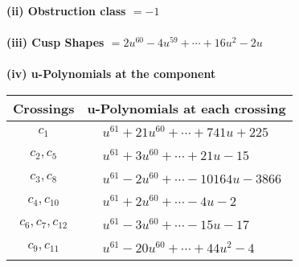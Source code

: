 \documentclass[1p]{elsarticle_modified}
\theoremstyle{definition}
\begin{document}
\flushleft \textbf{(ii) Obstruction class $= -1$}\\~\\
\flushleft \textbf{(iii) Cusp Shapes $= 2 u^{60}-4 u^{59}+\cdots+16 u^2-2 u$}\\~\\
\newpage\renewcommand{\arraystretch}{1}
\flushleft \textbf{(iv) u-Polynomials at the component}\newline \\
\begin{tabular}{m{50pt}|m{274pt}}
Crossings & \hspace{64pt}u-Polynomials at each crossing \\
\hline $$\begin{aligned}c_{1}\end{aligned}$$&$\begin{aligned}
&u^{61}+21 u^{60}+\cdots+741 u+225
\end{aligned}$\\
\hline $$\begin{aligned}c_{2},c_{5}\end{aligned}$$&$\begin{aligned}
&u^{61}+3 u^{60}+\cdots+21 u-15
\end{aligned}$\\
\hline $$\begin{aligned}c_{3},c_{8}\end{aligned}$$&$\begin{aligned}
&u^{61}-2 u^{60}+\cdots-10164 u-3866
\end{aligned}$\\
\hline $$\begin{aligned}c_{4},c_{10}\end{aligned}$$&$\begin{aligned}
&u^{61}+2 u^{60}+\cdots-4 u-2
\end{aligned}$\\
\hline $$\begin{aligned}c_{6},c_{7},c_{12}\end{aligned}$$&$\begin{aligned}
&u^{61}-3 u^{60}+\cdots-15 u-17
\end{aligned}$\\
\hline $$\begin{aligned}c_{9},c_{11}\end{aligned}$$&$\begin{aligned}
&u^{61}-20 u^{60}+\cdots+44 u^2-4
\end{aligned}$\\
\hline
\end{tabular}\\~\\
\end{document}
